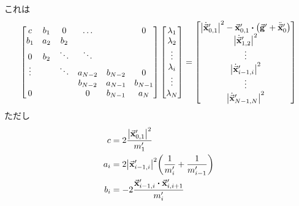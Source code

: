 \documentclass[uplatex]{jsarticle}
\begin{document}
これは
\begin{align}
    \begin{bmatrix}
        c   & b_1 &      0 & \dots   &         & 0 \\
        b_1 & a_2 &    b_2 &         &         & \\
        0   & b_2 & \ddots & \ddots  &         &  \\
        \vdots &  & \ddots & a_{N-2} & b_{N-2} & 0 \\
            &     &        & b_{N-2} & a_{N-1} & b_{N-1} \\
        0   &     &        &       0 & b_{N-1} & a_N
    \end{bmatrix}
    \begin{bmatrix}
        \lambda_1 \\ \lambda_2 \\ \vdots \\ \lambda_i \\ \vdots \\ \lambda_N
    \end{bmatrix}
    =
    \begin{bmatrix}
        \abs{\dot{\va{x}}_{0,1}^\prime}^2 - \va{x}_{0,1}^\prime \vdot \qty(\va{g}^\prime +\ddot{\va{x}}_0^\prime) \\
        \abs{\dot{\va{x}}_{1,2}^\prime}^2 \\
        \vdots \\
        \abs{\dot{\va{x}}_{i-1,i}^\prime}^2 \\
        \vdots \\
        \abs{\dot{\va{x}}_{N-1,N}^\prime}^2 \\
    \end{bmatrix}
\end{align}
ただし
\begin{align}
    c &= 2\frac{\abs{\va{x}_{0,1}^\prime}^2}{m_1^\prime} \\
    a_i &= 2\abs{\va{x}_{i-1,i}^\prime}^2 \qty(\frac{1}{m_i^\prime} + \frac{1}{m_{i-1}^\prime}) \\
    b_i &= -2\frac{\va{x}_{i-1,i}^\prime \vdot \va{x}_{i,i+1}^\prime}{m_i^\prime}
\end{align}




\end{document}
